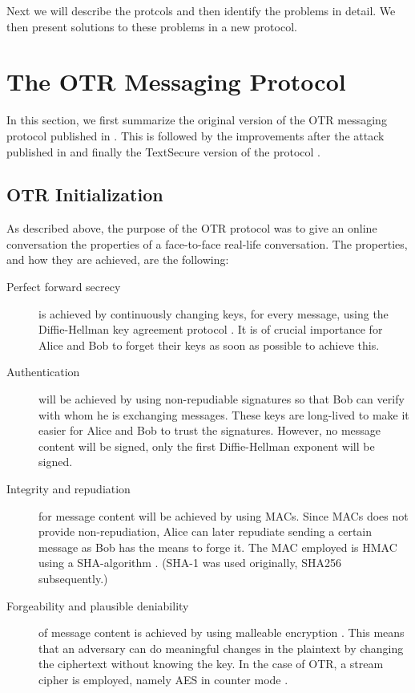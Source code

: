 Next we will describe the protcols and then identify the problems in detail.
We then present solutions to these problems in a new protocol.


\section{The \acs{OTR} Messaging Protocol}

In this section, we first summarize the original version of the \ac{OTR} 
messaging protocol published in \cite{otr2004}.
This is followed by the improvements after the attack published in 
\cite{di2005secure} and finally the TextSecure version of the protocol 
\cite{frosch2014secure}.

\subsection{\acs{OTR} Initialization}

As described above, the purpose of the \ac{OTR} protocol was to give an online 
conversation the properties of a face-to-face real-life conversation.
The properties, and how they are achieved, are the following:
\begin{description}
  \item[Perfect forward secrecy] is achieved by continuously changing keys, for 
    every message, using the Diffie-Hellman key agreement protocol \cite{dh}.
    It is of crucial importance for Alice and Bob to forget their keys as soon 
    as possible to achieve this.

  \item[Authentication] will be achieved by using non-repudiable signatures so 
    that Bob can verify with whom he is exchanging messages.
    These keys are long-lived to make it easier for Alice and Bob to trust the 
    signatures.
    However, no message content will be signed, only the first Diffie-Hellman 
    exponent will be signed.

  \item[Integrity and repudiation] for message content will be achieved by 
    using \acp{MAC}.
    Since \acp{MAC} does not provide non-repudiation, Alice can later repudiate 
    sending a certain message as Bob has the means to forge it.
    The \ac{MAC} employed is HMAC \cite{hmac} using a SHA-algorithm \cite{shs}.
    (SHA-1 was used originally, SHA256 subsequently.)

  \item[Forgeability and plausible deniability] of message content is achieved 
    by using malleable encryption \cite{nonmalleable}.
    This means that an adversary can do meaningful changes in the plaintext by 
    changing the ciphertext without knowing the key.
    In the case of \ac{OTR}, a stream cipher is employed, namely AES \cite{aes} 
    in counter mode \cite{blockmodes}.
\end{description}

